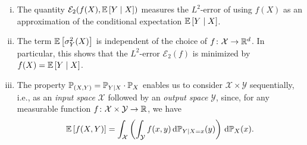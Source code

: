 \begin{remark}
\label{rmk: input-output}
\begin{enumerate}[(i)]
    \item The quantity $\mathcal{E}_2(f(X), \mathbb{E}\left[Y \mathrel{|} X\right])$ measures the $L^2$-error of using $f(X)$ as an approximation of the conditional expectation $\mathbb{E}\left[Y \mathrel{|} X\right]$.

    \item The term $\mathbb{E}\left[\sigma_Y^2(X)\right]$ is independent of the choice of $f \colon \mathcal{X} \to \mathbb{R}^d$. In particular, this shows that the $L^2$-error $\mathcal{E}_2(f)$ is minimized by $f(X) = \mathbb{E}\left[Y \mathrel{|} X\right]$.

    \item The property $\mathbb{P}_{(X, Y)} = \mathbb{P}_{Y \mathrel{|} X} \cdot \mathbb{P}_X$ enables us to consider $\mathcal{X} \times \mathcal{Y}$ sequentially, i.e., as an \emph{input space} $\mathcal{X}$ followed by an \emph{output space} $\mathcal{Y}$, since, for any measurable function $f \colon \mathcal{X} \times \mathcal{Y} \to \mathbb{R}$, we have
        \[
            \mathbb{E}\left[f(X, Y)\right] = \int_{\mathcal{X}} \left( \int_{\mathcal{Y}} f(x, y) \,\mathrm{d}\mathbb{P}_{Y \mathrel{|} X=x}(y) \right) \,\mathrm{d}\mathbb{P}_{X}(x).
        \]
\end{enumerate}
\end{remark}
